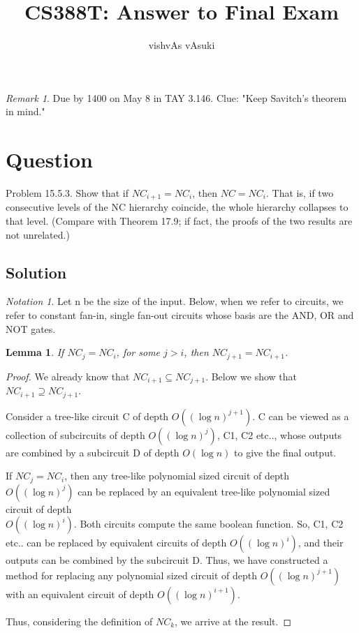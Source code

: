 \documentclass[10pt]{amsart}
\title{CS388T: Answer to Final Exam}
\author{vishvAs vAsuki}
\newtheorem{lem}[thm]{Lemma}
\theoremstyle{remark}
\newtheorem{rem}[thm]{Remark}
\newtheorem{notation}[thm]{Notation}
\begin{document}
\maketitle
\begin{rem}
Due by 1400 on May 8 in TAY 3.146. Clue: "Keep Savitch's theorem in mind."
\end{rem}


\section{Question}
Problem 15.5.3. Show that if $NC_{i+1} = NC_{i}$, then $NC = NC_{i}$. That is, if two consecutive levels of the NC hierarchy coincide, the whole hierarchy collapses to that level. (Compare with Theorem 17.9; if fact, the proofs of the two results are not unrelated.)

\subsection{Solution}
\begin{notation}
Let n be the size of the input. Below, when we refer to circuits, we refer to constant fan-in, single fan-out circuits whose basis are the AND, OR and NOT gates.
\end{notation}

\begin{lem}
If $NC_{j} = NC_{i}$, for some $j>i$, then $NC_{j+1} = NC_{i+1}$.
\end{lem}
\begin{proof}
We already know that $NC_{i+1} \subseteq NC_{j+1} $. Below we show that $NC_{i+1} \supseteq NC_{j+1}$.

Consider a tree-like circuit C of depth $O((\log n)^{j+1})$. C can be viewed as a collection of subcircuits of depth $O((\log n)^{j})$, C1, C2 etc.., whose outputs are combined by a subcircuit D of depth $O(\log n)$ to give the final output.

If $NC_{j} = NC_{i}$, then any tree-like polynomial sized circuit of depth \\
$O((\log n)^{j})$ can be replaced by an equivalent tree-like polynomial sized circuit of depth \\
$O((\log n)^{i})$. Both circuits compute the same boolean function. So, C1, C2 etc.. can be replaced by equivalent circuits of depth $O((\log n)^{i})$, and their outputs can be combined by the subcircuit D. Thus, we have constructed a method for replacing any polynomial sized circuit of depth $O((\log n)^{j+1})$ with an equivalent circuit of depth $O((\log n)^{i+1})$.

Thus, considering the definition of $NC_{k}$, we arrive at the result.
\end{proof}
\end{document}
